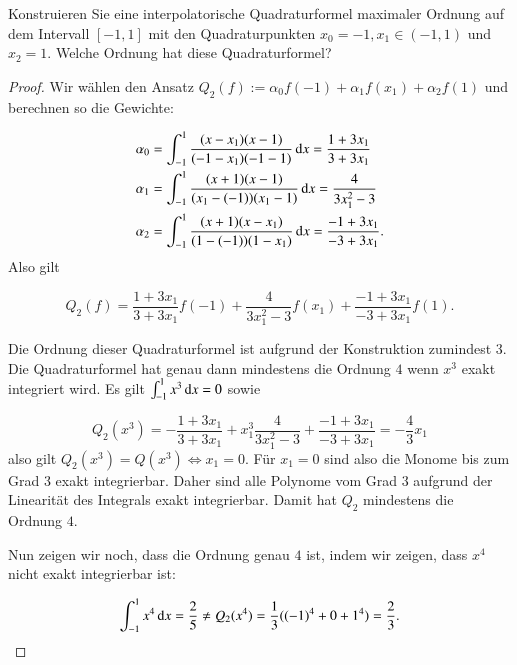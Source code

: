 
\begin{exercise}
  Konstruieren Sie eine interpolatorische Quadraturformel maximaler Ordnung auf dem Intervall $[-1,1]$ mit den Quadraturpunkten $x_0=-1,x_1 \in (-1,1)$ und $x_2=1$. Welche Ordnung hat diese Quadraturformel?
\end{exercise}
\begin{proof}

  Wir wählen den Ansatz $Q_2(f):=\alpha_0f(-1)+\alpha_1 f(x_1)+\alpha_2f(1)$ und berechnen so die Gewichte:

  \begin{equation*}
    \begin{split}
      \alpha_0&=\int_{-1}^1{\frac{(x-x_1)(x-1)}{(-1-x_1)(-1-1)} \dif x}=\frac{1+3x_1}{3+3x_1} \\
      \alpha_1&=\int_{-1}^1{\frac{(x+1)(x-1)}{(x_1-(-1))(x_1-1)} \dif x}=\frac{4}{3x_1^2-3} \\
      \alpha_2&=\int_{-1}^1{\frac{(x+1)(x-x_1)}{(1-(-1))(1-x_1)} \dif x}=\frac{-1+3x_1}{-3+3x_1}. \\
    \end{split}
  \end{equation*}
  Also gilt

  \begin{equation*}
    Q_2(f)=\frac{1+3x_1}{3+3x_1}f(-1)+\frac{4}{3x_1^2-3}f(x_1)+\frac{-1+3x_1}{-3+3x_1}f(1).
  \end{equation*}

  Die Ordnung dieser Quadraturformel ist aufgrund der Konstruktion zumindest $3$. Die Quadraturformel hat genau dann mindestens die Ordnung $4$ wenn $x^3$ exakt integriert wird. Es gilt $\int_{-1}^1{x^3 \dif x}=0$ sowie

  \begin{equation*}
    Q_2(x^3)=-\frac{1+3x_1}{3+3x_1}+x_1^3\frac{4}{3x_1^2-3}+\frac{-1+3x_1}{-3+3x_1}=-\frac{4}{3}x_1
  \end{equation*}
  also gilt $Q_2(x^3)=Q(x^3) \iff x_1=0$. Für $x_1=0$ sind also die Monome bis zum Grad 3 exakt integrierbar. Daher sind alle Polynome vom Grad $3$ aufgrund der Linearität des Integrals exakt integrierbar. Damit hat $Q_2$ mindestens die Ordnung $4$.

  Nun zeigen wir noch, dass die Ordnung genau $4$ ist, indem wir zeigen, dass $x^4$ nicht exakt integrierbar ist:

  \begin{equation*}
    \int_{-1}^1{x^4 \dif x} = \frac{2}{5} \neq Q_2(x^4)=\frac{1}{3}({(-1)}^4 + 0 + 1^4) = \frac{2}{3}.
  \end{equation*}
\end{proof}
